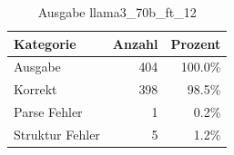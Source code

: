 
\begin{table}[!ht]
\centering
\begin{tabular}{lrr}
\toprule
\textbf{Kategorie} & \textbf{Anzahl} & \textbf{Prozent} \\
\midrule
Ausgabe & 404 & 100.0\% \\
Korrekt & 398 & 98.5\% \\
Parse Fehler & 1 & 0.2\% \\
Struktur Fehler & 5 & 1.2\% \\
\bottomrule
\end{tabular}
\caption{Ausgabe llama3_70b_ft_12}
\label{tab:file_counts}
\end{table}
    